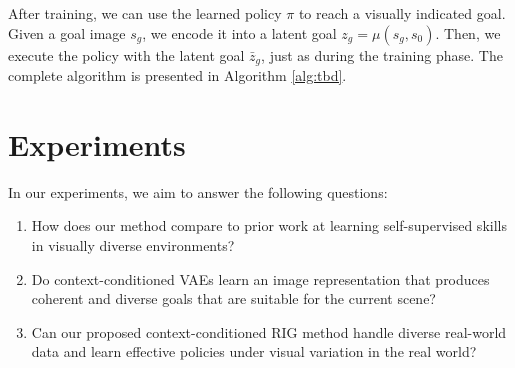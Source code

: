 After training, we can use the learned policy $\pi$ to reach a visually indicated goal.
Given a goal image $s_g$, we encode it into a latent goal $z_g = \mu(s_g, s_0)$.
Then, we execute the policy with the latent goal $\bar{z}_g$, just as during the training phase.
The complete algorithm is presented in Algorithm \ref{alg:tbd}.

\section{Experiments}

In our experiments, we aim to answer the following questions:
\begin{enumerate}
    \item How does our method compare to prior work at learning self-supervised skills in visually diverse environments?
    \item Do context-conditioned VAEs learn an image representation that produces coherent and diverse goals that are suitable for the current scene?
    \item Can our proposed context-conditioned RIG method handle diverse real-world data and learn effective policies under visual variation in the real world?
\end{enumerate}

